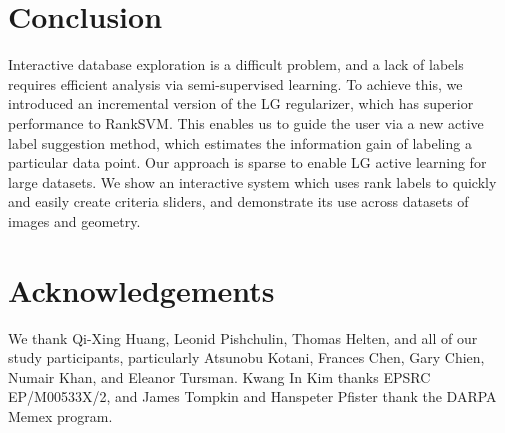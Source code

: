 \documentclass{article}
\begin{document}
\section{Conclusion}
\label{s:conclusion}
Interactive database exploration is a difficult problem, and a lack of labels requires efficient analysis via semi-supervised learning. To achieve this, we introduced an incremental version of the LG regularizer, which has superior performance to RankSVM. This enables us to guide the user via a new active label suggestion method, which estimates the information gain of labeling a particular data point. Our approach is sparse to enable LG active learning for large datasets. We show an interactive system which uses rank labels to quickly and easily create criteria sliders, and demonstrate its use across datasets of images and geometry.

\section*{Acknowledgements}
We thank Qi-Xing Huang, Leonid Pishchulin, Thomas Helten, and all of our study participants, particularly Atsunobu Kotani, Frances Chen, Gary Chien, Numair Khan, and Eleanor Tursman. Kwang In Kim thanks EPSRC EP/M00533X/2, and James Tompkin and Hanspeter Pfister thank the DARPA Memex program.

\vfill


\end{document}
